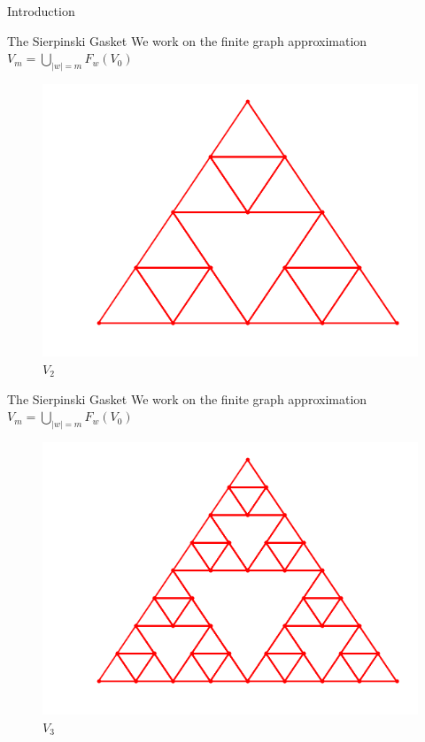 \documentclass[xcolor = dvipsnames]{beamer}
\begin{document}
\begin{section}{Introduction}
\begin{frame}{The Sierpinski Gasket}
    We work on the finite graph approximation $V_m = \bigcup_{|w|=m}F_{w}(V_0)$
    \begin{figure}
        \centering
        \includegraphics[width=0.7\linewidth]{images/V2.png}
        \caption{$V_2$}
    \end{figure}
\end{frame}

\begin{frame}{The Sierpinski Gasket}
    We work on the finite graph approximation $V_m = \bigcup_{|w|=m}F_{w}(V_0)$
    \begin{figure}
        \centering
        \includegraphics[width=0.7\linewidth]{images/V3.png}
        \caption{$V_3$}
    \end{figure}
\end{frame}


\end{section}
\end{document}
